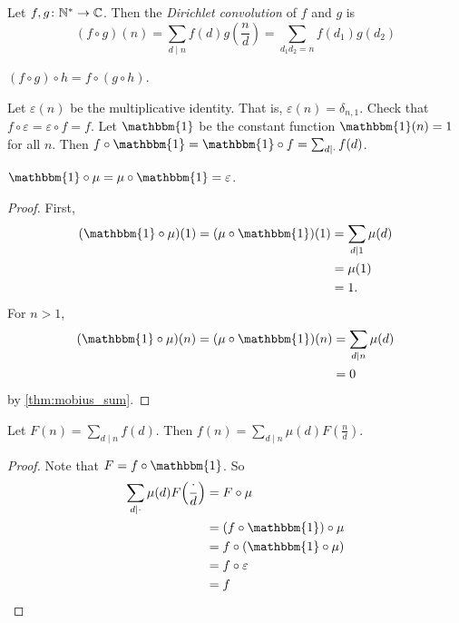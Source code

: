 \begin{definition*} \label{def:dirichlet}
    Let $f, g\colon \mathbb{N}^* \to \mathbb{C}$.
    Then the \emph{Dirichlet convolution} of $f$ and $g$ is \[
        (f \circ g)(n) = \sum_{d \mid n} f(d) g(\frac{n}{d})
            = \sum_{d_1 d_2 = n} f(d_1) g(d_2)
    \]
\end{definition*}
\begin{exercise}
    $(f \circ g) \circ h = f \circ (g \circ h)$.
\end{exercise}
Let $\varepsilon(n)$ be the multiplicative identity.
That is, $\varepsilon(n) = \delta_{n,1}$.
Check that $f \circ \varepsilon = \varepsilon \circ f = f$.
Let $\mathbbm{1}$ be the constant function $\mathbbm{1}(n) = 1$ for all $n$.
Then $f \circ \mathbbm{1} = \mathbbm{1} \circ f = \sum_{d \mid \cdot} f(d)$.
\begin{lemma}
    $\mathbbm{1} \circ \mu = \mu \circ \mathbbm{1} = \varepsilon$.
\end{lemma}
\begin{proof}
    First, \begin{align*}
        (\mathbbm{1} \circ \mu)(1) = (\mu \circ \mathbbm{1})(1)
        &= \sum_{d \mid 1} \mu(d) \\
        &= \mu(1) \\
        &= 1.
    \end{align*}
    For $n > 1$, \begin{align*}
        (\mathbbm{1} \circ \mu)(n) = (\mu \circ \mathbbm{1})(n)
        &= \sum_{d \mid n} \mu(d) \\
        &= 0
    \end{align*}
    by \cref{thm:mobius_sum}.
\end{proof}

\begin{theorem*} \label{thm:mobius_inversion}
    Let $F(n) = \sum_{d \mid n} f(d)$.
    Then $f(n) = \sum_{d \mid n} \mu(d) F(\frac{n}{d})$.
\end{theorem*}
\begin{proof}
    Note that $F = f \circ \mathbbm{1}$.
    So \begin{align*}
        \sum_{d \mid \cdot} \mu(d) F\paren*[\Big]{\frac{\cdot}{d}}
            &= F \circ \mu \\
            &= (f \circ \mathbbm{1}) \circ \mu \\
            &= f \circ (\mathbbm{1} \circ \mu) \\
            &= f \circ \varepsilon \\
            &= f \qedhere
    \end{align*}
\end{proof}
